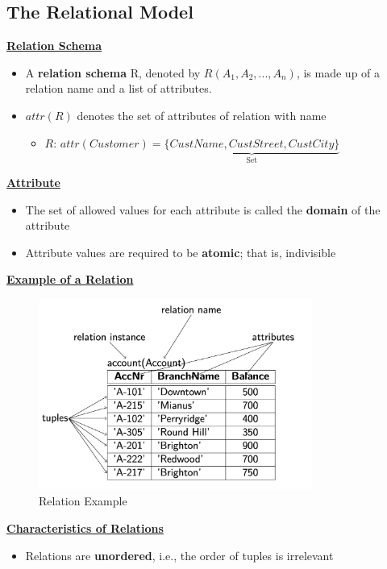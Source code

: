 \subsection{The Relational Model}

\textbf{\underline{Relation Schema}}
\bigskip
\begin{itemize}[label=\(\rhd\)]
    \item A \textbf{relation schema} R, denoted by $R(A_1,A_2,...,A_n)$, is made up of a relation name and a list of attributes.
    \item $attr(R)$ denotes the set of attributes of relation with name 
    \begin{itemize}[label=\(\rhd\)]
        \item[] $R$: $attr(Customer) = \underbrace{\{CustName, CustStreet, CustCity\}}_\text{Set}$
    \end{itemize}
\end{itemize}

\textbf{\underline{Attribute}}
\bigskip
\begin{itemize}[label=\(\rhd\)]
    \item The set of allowed values for each attribute is called the \textbf{domain} of the attribute
    \item Attribute values are required to be \textbf{atomic}; that is, indivisible
\end{itemize}

\textbf{\underline{Example of a Relation}}
\bigskip
\begin{figure}[H]
\centering
\includegraphics[width=0.8\textwidth]{images/Screenshot 2024-05-01 at 17.58.27.jpg}
\caption{Relation Example}
\end{figure}

\textbf{\underline{Characteristics of Relations}}
\bigskip
\begin{itemize}[label=\(\rhd\)]
    \item Relations are \textbf{unordered}, i.e., the order of tuples is irrelevant
\end{itemize}

